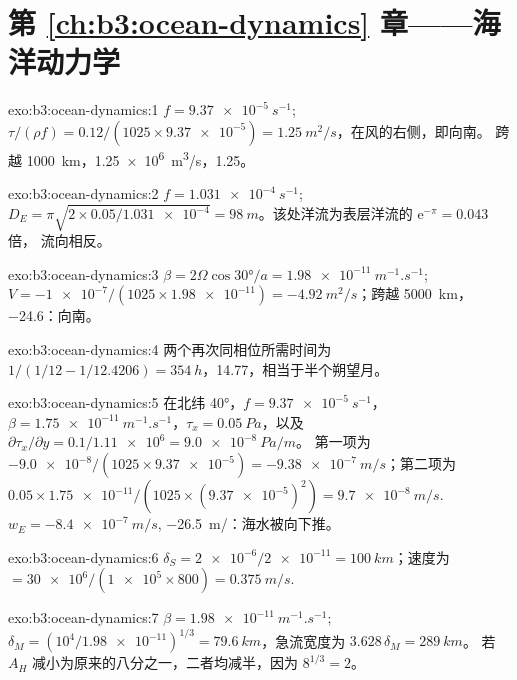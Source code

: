 \section*{第 \ref{ch:b3:ocean-dynamics} 章——海洋动力学}

\begin{solution}{exo:b3:ocean-dynamics:1}
$f = \qty{9.37e-5}{s^{-1}}$; $\tau/(\rho f) = 0.12/(1025\times\num{9.37e-5})
= \qty{1.25}{m^2/s}$，在风的右侧，即向南。
跨越 \qty{1000}{km}，\qty{1.25e6}{m^3/s}，\qty{1.25}{\sverdrup}。
\end{solution}

\begin{solution}{exo:b3:ocean-dynamics:2}
$f = \qty{1.031e-4}{s^{-1}}$; $D_E = \pi\sqrt{2\times0.05/\num{1.031e-4}}
= \qty{98}{m}$。该处洋流为表层洋流的 $\mathrm e^{-\pi} = \num{0.043}$ 倍，
流向相反。
\end{solution}

\begin{solution}{exo:b3:ocean-dynamics:3}
$\beta = 2\Omega\cos\ang{30}/a = \qty{1.98e-11}{m^{-1}.s^{-1}}$; $V =
\num{-1e-7}/(1025\times\num{1.98e-11}) = \qty{-4.92}{m^2/s}$；跨越
\qty{5000}{km}，\qty{-24.6}{\sverdrup}：向南。
\end{solution}

\begin{solution}{exo:b3:ocean-dynamics:4}
两个再次同相位所需时间为 $1/(1/12 - 1/12.4206) =
\qty{354}{h}$，\num{14.77}，相当于半个朔望月。
\end{solution}

\begin{solution}{exo:b3:ocean-dynamics:5}
在北纬 \ang{40}，$f = \qty{9.37e-5}{s^{-1}}$，$\beta =
\qty{1.75e-11}{m^{-1}.s^{-1}}$，$\tau_x = \qty{0.05}{Pa}$，以及
$\partial\tau_x/\partial y = 0.1/\num{1.11e6} = \qty{9.0e-8}{Pa/m}$。
第一项为 $-\num{9.0e-8}/(1025\times\num{9.37e-5}) =
\qty{-9.38e-7}{m/s}$；第二项为 $0.05\times\num{1.75e-11}/(1025\times
(\num{9.37e-5})^2) = \qty{+9.7e-8}{m/s}$. $w_E = \qty{-8.4e-7}{m/s}$,
\qty{-26.5}{m/}：海水被向下推。
\end{solution}

\begin{solution}{exo:b3:ocean-dynamics:6}
$\delta_S = \num{2e-6}/\num{2e-11} = \qty{100}{km}$；速度为 $=
\num{30e6}/(\num{1e5}\times800) = \qty{0.375}{m/s}$.
\end{solution}

\begin{solution}{exo:b3:ocean-dynamics:7}
$\beta = \qty{1.98e-11}{m^{-1}.s^{-1}}$; $\delta_M = (10^4/\num{1.98e-11})^{1/3}
= \qty{79.6}{km}$，急流宽度为 $3.628\,\delta_M = \qty{289}{km}$。
若 $A_H$ 减小为原来的八分之一，二者均减半，因为 $8^{1/3} = 2$。
\end{solution}

